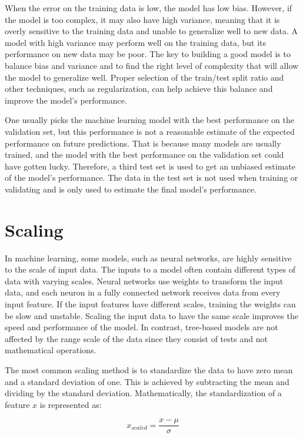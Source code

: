 When the error on the training data is low, the model has low bias.
However, if the model is too complex, it may also have high variance, meaning that it is overly sensitive to the training data and unable to generalize well to new data.
A model with high variance may perform well on the training data, but its performance on new data may be poor.
The key to building a good model is to balance bias and variance and to find the right level of complexity that will allow the model to generalize well.
Proper selection of the train/test split ratio and other techniques, such as regularization, can help achieve this balance and improve the model's performance.

One usually picks the machine learning model with the best performance on the validation set, but this performance is not a reasonable estimate of the expected performance on future predictions.
That is because many models are usually trained, and the model with the best performance on the validation set could have gotten lucky.
Therefore, a third test set is used to get an unbiased estimate of the model's performance.
The data in the test set is not used when training or validating and is only used to estimate the final model's performance.


\section{Scaling}
In machine learning, some models, such as neural networks, are highly sensitive to the scale of input data.
The inputs to a model often contain different types of data with varying scales.
Neural networks use weights to transform the input data, and each neuron in a fully connected network receives data from every input feature.
If the input features have different scales, training the weights can be slow and unstable.
Scaling the input data to have the same scale improves the speed and performance of the model.
In contrast, tree-based models are not affected by the range scale of the data since they consist of tests and not mathematical operations.

The most common scaling method is to standardize the data to have zero mean and a standard deviation of one. This is achieved by subtracting the mean and dividing by the standard deviation.
Mathematically, the standardization of a feature $x$ is represented as:

\begin{equation}
x_{scaled} = \frac{x - \mu}{\sigma}
\end{equation}

